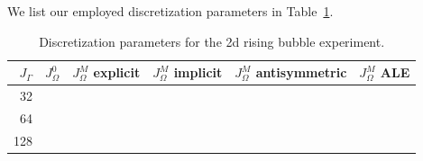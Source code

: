 We list our employed discretization parameters in
Table~\ref{tab:risingbubble2Delements}.
\begin{table}
\center
\begin{tabular}{rrrrrr}
\hline
$J_\Gamma$ & $J_\Omega^0$ & $J_\Omega^M$ explicit & $J_\Omega^M$ implicit &
$J_\Omega^M$ antisymmetric & $J_\Omega^M$ ALE \\
\hline
 32 & & & & & \\
 64 & & & & & \\
128 & & & & & \\
\hline
\end{tabular}
\caption[Navier--Stokes 2d rising bubble meshes parameters]
{Discretization parameters for the 2d rising bubble experiment.}
\label{tab:risingbubble2Delements}
\end{table}

